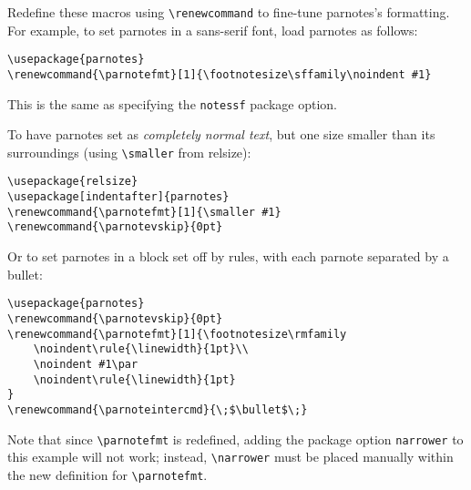 \documentclass[10pt]{article}
\renewcommand{\parnotefmt}[1]{\centerline{\colorbox{black!10}{\parbox{0.82\textwidth}{\footnotesize\sffamily\noindent #1}}}}
\begin{document}
Redefine these macros using \verb+\renewcommand+ to fine-tune \textsf{parnotes}'s formatting. For
example, to set parnotes in a sans-serif font, load \textsf{parnotes} as follows:
\begin{lstlisting}
\usepackage{parnotes}
\renewcommand{\parnotefmt}[1]{\footnotesize\sffamily\noindent #1}
\end{lstlisting}
This is the same as specifying the \texttt{notessf} package option.

To have parnotes set as \textit{completely
normal text}, but one size smaller than its surroundings (using \verb+\smaller+ from \textsf{relsize}):
\begin{lstlisting}
\usepackage{relsize}
\usepackage[indentafter]{parnotes}
\renewcommand{\parnotefmt}[1]{\smaller #1}
\renewcommand{\parnotevskip}{0pt}
\end{lstlisting}
Or to set parnotes in a block set off by rules, with each parnote separated by a bullet:
\begin{lstlisting}
\usepackage{parnotes}
\renewcommand{\parnotevskip}{0pt}
\renewcommand{\parnotefmt}[1]{\footnotesize\rmfamily
    \noindent\rule{\linewidth}{1pt}\\
    \noindent #1\par
    \noindent\rule{\linewidth}{1pt}
}
\renewcommand{\parnoteintercmd}{\;$\bullet$\;}
\end{lstlisting}

Note that since \verb+\parnotefmt+ is redefined, adding the package option \texttt{narrower} to this example will not work;
instead, \verb+\narrower+ must be placed manually within the new definition for \verb+\parnotefmt+.
\end{document}
